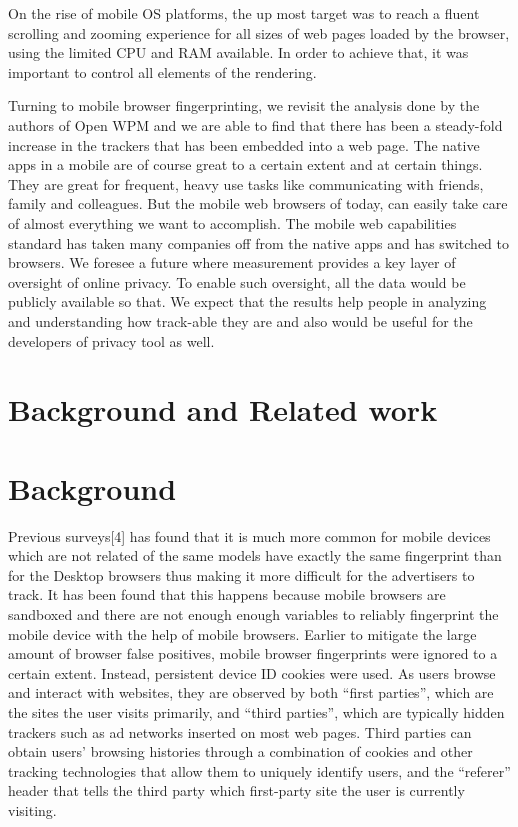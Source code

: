 \documentclass[journal]{IEEEtran}
\begin{document}
On the rise of mobile OS platforms, the up most target was to reach a fluent
scrolling and zooming experience for all sizes of web pages loaded by the
browser, using the limited CPU and RAM available. In order to achieve that, it
was important to control all elements of the rendering.


Turning to mobile browser fingerprinting, we revisit the analysis done by the
authors of Open WPM and we are able to find that there has been a steady-fold
increase in the trackers that has been embedded into a web page. The native apps
in a mobile are of course great to a certain extent and at certain things. They
are great for frequent, heavy use tasks like communicating with friends, family
and colleagues. But the mobile web browsers of today, can easily take care of
almost everything we want to accomplish. The mobile web capabilities standard
has taken many companies off from the native apps and has switched to browsers. 
We foresee a future where measurement provides a key layer of oversight of
online privacy. To enable such oversight, all the data would be publicly
available so that. We expect that the results help people in analyzing and
understanding how track-able they are and also would be useful for the developers of privacy tool as well.




\section{Background and Related work}
\section*{Background}
Previous surveys[4] has found that it is much more common for mobile devices
which are not related of the same models have exactly the same fingerprint than
for the Desktop browsers thus making it more difficult for the advertisers to
track. It has been found that this happens because mobile browsers are sandboxed
and there are not enough enough variables to reliably fingerprint the mobile
device with the help of mobile browsers. Earlier to mitigate the large amount of
browser false positives, mobile browser fingerprints were ignored to a certain
extent. Instead, persistent device ID cookies were used. As users browse and
interact with websites, they are observed by both “first parties”, which are the
sites the user visits primarily, and “third parties”, which are typically hidden
trackers such as ad networks inserted on most web pages. Third parties can
obtain users’ browsing histories through a combination of cookies and other
tracking technologies that allow them to uniquely identify users, and the
“referer” header that tells the third party which first-party site the user is
currently visiting.
\end{document}
